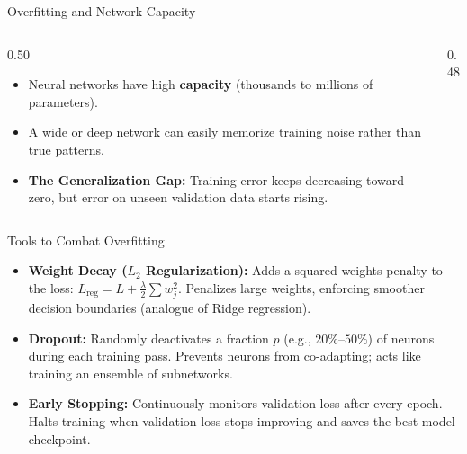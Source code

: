 \begin{frame}{Overfitting and Network Capacity}
    \begin{columns}[c]
        \begin{column}{0.50\textwidth}
            \small
            \begin{itemize}
                \item Neural networks have high \textbf{capacity} (thousands to millions of parameters).
                \item A wide or deep network can easily memorize training noise rather than true patterns.
                \item \textbf{The Generalization Gap:} Training error keeps decreasing toward zero, but error on unseen validation data starts rising.
            \end{itemize}
        \end{column}
        \begin{column}{0.48\textwidth}
            \centering
        \end{column}
    \end{columns}
\end{frame}

\begin{frame}{Tools to Combat Overfitting}
    \begin{itemize}
        \item \textbf{Weight Decay ($L_2$ Regularization):}
        Adds a squared-weights penalty to the loss: $L_{\text{reg}} = L + \frac{\lambda}{2} \sum w_j^2$.
        Penalizes large weights, enforcing smoother decision boundaries (analogue of Ridge regression).
        \item \textbf{Dropout:}
        Randomly deactivates a fraction $p$ (e.g., $20\%$--$50\%$) of neurons during each training pass.
        Prevents neurons from co-adapting; acts like training an ensemble of subnetworks.
        \item \textbf{Early Stopping:}
        Continuously monitors validation loss after every epoch. Halts training when validation loss stops improving and saves the best model checkpoint.
    \end{itemize}
\end{frame}



